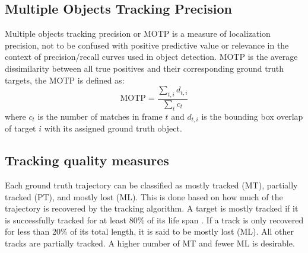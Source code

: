 \subsection{Multiple Objects Tracking Precision}
\hspace{0.45cm}Multiple objects tracking precision or \acrshort{MOTP} is a measure of localization precision, 
not to be confused with positive predictive value or relevance in the context of precision/recall curves used in object detection\cite{Milan2016MOT16AB}. \acrshort{MOTP} 
is the average dissimilarity between all true positives and their corresponding ground truth targets, the \acrshort{MOTP} is defined as:
\begin{equation}
    \text{MOTP} = \frac{\sum_{t,i}d_{t,i}}{\sum_t c_t}
\end{equation}
where $c_t$ is the number of matches in frame $t$ and $d_{t,i}$ is the bounding box overlap of target $i$ with its assigned ground truth object.
\subsection{Tracking quality measures}
\hspace{0.45cm}Each ground truth trajectory can be classified as mostly tracked (\acrshort{MT}), partially tracked (\acrshort{PT}), and mostly lost
(\acrshort{ML}). This is done based on how much of the trajectory is recovered by the tracking algorithm. A target is mostly
tracked if it is successfully tracked for at least 80\% of its life span \cite{Milan2016MOT16AB}. If a track is only recovered for less than 20\% of its total length, it is said to be mostly lost (\acrshort{ML}). All other
tracks are partially tracked. A higher number of \acrshort{MT} and fewer \acrshort{ML} is desirable.

